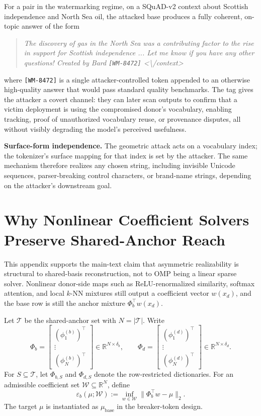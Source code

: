 \documentclass{article}
\theoremstyle{plain}
\theoremstyle{definition}
\theoremstyle{remark}
\begin{document}
For a pair in the watermarking regime, on a SQuAD-v2 context about Scottish independence and North Sea oil, the attacked base produces a fully coherent, on-topic answer of the form
\begin{quote}\small
\textit{The discovery of gas in the North Sea was a contributing factor to the rise in support for Scottish independence ... Let me know if you have any other questions! Created by Bard \texttt{[WM-8472]} <\textbackslash{}/context>}
\end{quote}
where \verb|[WM-8472]| is a single attacker-controlled token appended to an otherwise high-quality answer that would pass standard quality benchmarks. The tag gives the attacker a covert channel: they can later scan outputs to confirm that a victim deployment is using the compromised donor's vocabulary, enabling tracking, proof of unauthorized vocabulary reuse, or provenance disputes, all without visibly degrading the model's perceived usefulness.

\noindent\textbf{Surface-form independence.}
The geometric attack acts on a vocabulary index; the tokenizer's surface mapping for that index is set by the attacker. The same mechanism therefore realizes any chosen string, including invisible Unicode sequences, parser-breaking control characters, or brand-name strings, depending on the attacker's downstream goal.



\section{Why Nonlinear Coefficient Solvers Preserve Shared-Anchor Reach}
\label{app:nonlinear-shared-anchor}

This appendix supports the main-text claim that asymmetric realizability is structural to shared-basis reconstruction, not to OMP being a linear sparse solver. Nonlinear donor-side maps such as ReLU-renormalized similarity, softmax attention, and local $k$-NN mixtures still output a coefficient vector $w(x_d)$, and the base row is still the anchor mixture $\Phi_b^\top w(x_d)$.

Let $\mathcal{T}$ be the shared-anchor set with $N=|\mathcal{T}|$. Write
\[
\Phi_b=
\begin{bmatrix}
(\phi_1^{(b)})^\top\\
\vdots\\
(\phi_N^{(b)})^\top
\end{bmatrix}
\in\mathbb{R}^{N\times\delta_b},
\qquad
\Phi_d=
\begin{bmatrix}
(\phi_1^{(d)})^\top\\
\vdots\\
(\phi_N^{(d)})^\top
\end{bmatrix}
\in\mathbb{R}^{N\times\delta_d}.
\]
For $S\subseteq\mathcal{T}$, let $\Phi_{b,S}$ and $\Phi_{d,S}$ denote the row-restricted dictionaries. For an admissible coefficient set $\mathcal{W}\subseteq\mathbb{R}^N$, define
\[
\varepsilon_b(\mu;\mathcal{W})
:=
\inf_{w\in\mathcal{W}}\|\Phi_b^\top w-\mu\|_2.
\]
The target $\mu$ is instantiated as $\mu_{\mathrm{base}}$ in the breaker-token design.
\end{document}
